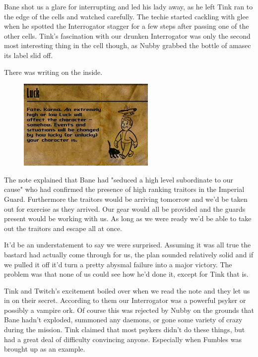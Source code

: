 Bane shot us a glare for interrupting and led his lady away, as he left Tink ran to the edge of the cells and watched carefully. 
The techie started cackling with glee when he spotted the Interrogator stagger for a few steps after passing one of the other cells. 
Tink's fascination with our drunken Interrogator was only the second most interesting thing in the cell though, as Nubby grabbed the bottle of amasec its label slid off. 


There was writing on the inside.

\begin{figure}
	\begin{center}
		\includegraphics[width=\figwidth]{pics/9/43.png}
	\end{center}
\end{figure}
The note explained that Bane had "seduced a high level subordinate to our cause" who had confirmed the presence of high ranking traitors in the Imperial Guard. 
Furthermore the traitors would be arriving tomorrow and we'd be taken out for exercise as they arrived. 
Our gear would all be provided and the guards present would be working with us. 
As long as we were ready we'd be able to take out the traitors and escape all at once.

It'd be an understatement to say we were surprised. 
Assuming it was all true the bastard had actually come through for us, the plan sounded relatively solid and if we pulled it off it'd turn a pretty abysmal failure into a major victory. 
The problem was that none of us could see how he'd done it, except for Tink that is.

Tink and Twitch's excitement boiled over when we read the note and they let us in on their secret. 
According to them our Interrogator was a powerful psyker or possibly a vampire ork. 
Of course this was rejected by Nubby on the grounds that Bane hadn't exploded, summoned any daemons, or gone some variety of crazy during the mission. 
Tink claimed that most psykers didn't do these things, but had a great deal of difficulty convincing anyone. 
Especially when Fumbles was brought up as an example.

